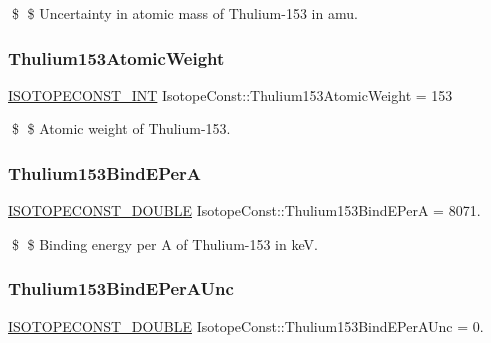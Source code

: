 \$ \$ Uncertainty in atomic mass of Thulium-\/153 in amu. \mbox{\label{group___isotope_const-_thulium-_tm153_ga474c5aa5861db1e7ea7da4e1732b523e}} 
\subsubsection{\texorpdfstring{Thulium153\+Atomic\+Weight}{Thulium153AtomicWeight}}
{\footnotesize\ttfamily \mbox{\hyperlink{group___isotope_const-_macros_ga5f18360b3e99483a35c32d789e62621c}{I\+S\+O\+T\+O\+P\+E\+C\+O\+N\+S\+T\+\_\+\+I\+NT}} Isotope\+Const\+::\+Thulium153\+Atomic\+Weight = 153}

\$ \$ Atomic weight of Thulium-\/153. \mbox{\label{group___isotope_const-_thulium-_tm153_gae01886535c17845ebdcba8e902e5c57a}} 
\subsubsection{\texorpdfstring{Thulium153\+Bind\+E\+PerA}{Thulium153BindEPerA}}
{\footnotesize\ttfamily \mbox{\hyperlink{group___isotope_const-_macros_ga8f45a7272ce02c0b4c65c44636ed719a}{I\+S\+O\+T\+O\+P\+E\+C\+O\+N\+S\+T\+\_\+\+D\+O\+U\+B\+LE}} Isotope\+Const\+::\+Thulium153\+Bind\+E\+PerA = 8071.}

\$ \$ Binding energy per A of Thulium-\/153 in keV. \mbox{\label{group___isotope_const-_thulium-_tm153_ga26c0ba919c824ea4f4f21ee2924ddc60}} 
\subsubsection{\texorpdfstring{Thulium153\+Bind\+E\+Per\+A\+Unc}{Thulium153BindEPerAUnc}}
{\footnotesize\ttfamily \mbox{\hyperlink{group___isotope_const-_macros_ga8f45a7272ce02c0b4c65c44636ed719a}{I\+S\+O\+T\+O\+P\+E\+C\+O\+N\+S\+T\+\_\+\+D\+O\+U\+B\+LE}} Isotope\+Const\+::\+Thulium153\+Bind\+E\+Per\+A\+Unc = 0.}

